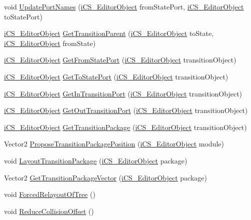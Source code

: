 \begin{DoxyCompactItemize}
\item 
void \hyperlink{classi_c_s___i_storage_ac0a010aa2b2c5afc88c81648d95bd3ea}{Update\+Port\+Names} (\hyperlink{classi_c_s___editor_object}{i\+C\+S\+\_\+\+Editor\+Object} from\+State\+Port, \hyperlink{classi_c_s___editor_object}{i\+C\+S\+\_\+\+Editor\+Object} to\+State\+Port)
\item 
\hyperlink{classi_c_s___editor_object}{i\+C\+S\+\_\+\+Editor\+Object} \hyperlink{classi_c_s___i_storage_a67daeca8650dac1c35b16c8084f6f580}{Get\+Transition\+Parent} (\hyperlink{classi_c_s___editor_object}{i\+C\+S\+\_\+\+Editor\+Object} to\+State, \hyperlink{classi_c_s___editor_object}{i\+C\+S\+\_\+\+Editor\+Object} from\+State)
\item 
\hyperlink{classi_c_s___editor_object}{i\+C\+S\+\_\+\+Editor\+Object} \hyperlink{classi_c_s___i_storage_af005d94a427953795b0946bc55fefb16}{Get\+From\+State\+Port} (\hyperlink{classi_c_s___editor_object}{i\+C\+S\+\_\+\+Editor\+Object} transition\+Object)
\item 
\hyperlink{classi_c_s___editor_object}{i\+C\+S\+\_\+\+Editor\+Object} \hyperlink{classi_c_s___i_storage_ad73b020d8638a37a3c85bf4dcea8fb15}{Get\+To\+State\+Port} (\hyperlink{classi_c_s___editor_object}{i\+C\+S\+\_\+\+Editor\+Object} transition\+Object)
\item 
\hyperlink{classi_c_s___editor_object}{i\+C\+S\+\_\+\+Editor\+Object} \hyperlink{classi_c_s___i_storage_a4a79e2a7c0db498d13e5dcf964185ce8}{Get\+In\+Transition\+Port} (\hyperlink{classi_c_s___editor_object}{i\+C\+S\+\_\+\+Editor\+Object} transition\+Object)
\item 
\hyperlink{classi_c_s___editor_object}{i\+C\+S\+\_\+\+Editor\+Object} \hyperlink{classi_c_s___i_storage_a109a851898386c073794b2263fbe5efe}{Get\+Out\+Transition\+Port} (\hyperlink{classi_c_s___editor_object}{i\+C\+S\+\_\+\+Editor\+Object} transition\+Object)
\item 
\hyperlink{classi_c_s___editor_object}{i\+C\+S\+\_\+\+Editor\+Object} \hyperlink{classi_c_s___i_storage_a56daf2a05c7ed2b3b8cfa1897d77298c}{Get\+Transition\+Package} (\hyperlink{classi_c_s___editor_object}{i\+C\+S\+\_\+\+Editor\+Object} transition\+Object)
\item 
Vector2 \hyperlink{classi_c_s___i_storage_a0c58cb8a2350cdb362e00534eddaaa9d}{Propose\+Transition\+Package\+Position} (\hyperlink{classi_c_s___editor_object}{i\+C\+S\+\_\+\+Editor\+Object} module)
\item 
void \hyperlink{classi_c_s___i_storage_ad8c94056380bc2a23cf58c5e3b2799e9}{Layout\+Transition\+Package} (\hyperlink{classi_c_s___editor_object}{i\+C\+S\+\_\+\+Editor\+Object} package)
\item 
Vector2 \hyperlink{classi_c_s___i_storage_a7e10e727f26d863263be5fcb1ef06915}{Get\+Transition\+Package\+Vector} (\hyperlink{classi_c_s___editor_object}{i\+C\+S\+\_\+\+Editor\+Object} package)
\item 
void \hyperlink{classi_c_s___i_storage_a61404c06e3cf2163d1e4c95eafb73875}{Forced\+Relayout\+Of\+Tree} ()
\item 
void \hyperlink{classi_c_s___i_storage_a921c09a6204a725e70c1d2e009e9be3c}{Reduce\+Collision\+Offset} ()
\end{DoxyCompactItemize}
